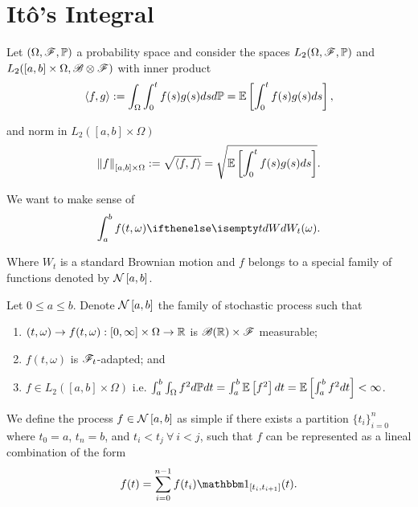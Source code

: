 \documentclass[../TGMAFFIRO.tex]{subfiles}
\begin{document}
\section{It\^o's Integral}
Let $(\Omega, \mathscr{F}, \mathbb{P})$ a probability space and consider the spaces $L_2(\Omega, \mathscr{F}, \mathbb{P})$ and $L_2([a, b]\times\Omega, \mathscr{B}\otimes\mathscr{F})$ with inner product
\begin{equation}
  \langle f, g\rangle := \int_\Omega\int_0^t f(s) g(s) ds d\mathbb{P} = \mathbb{E}\left[\int_0^t f(s)g(s) ds\right],
\end{equation}


and norm in $L_2([a, b] \times \Omega)$
\begin{equation}
  \left\lVert f\right\rVert_{[a, b] \times \Omega} := \sqrt{\langle f, f\rangle} = \sqrt{\mathbb{E}\left[\int_0^t f(s)g(s) ds\right]}.
\end{equation}

We want to make sense of
\begin{equation}
  \int_a^bf(t,\omega) \dW[t](\omega).
\end{equation}

Where $W_t$ is a standard Brownian motion and $f$ belongs to a special family of functions denoted by $\mathcal{N}\left[a, b\right]$.

\begin{definition}
	Let $0\leq a\leq b$. Denote $\mathcal{N}\left[a, b\right]$ the family of stochastic process such that
	\begin{enumerate}
		\item $(t, \omega) \to f(t, \omega):[0, \infty]\times\Omega \to \mathbb{R}$ is $\mathscr{B}(\mathbb{R})\times\mathscr{F}$ measurable;
		\item $f(t,\omega)$ is $\mathscr{F}_t$-adapted; and
		\item $f\in L_2([a,b]\times\Omega)$ i.e. $\int_a^b\int_\Omega f^2 d\mathbb{P} dt = \int_a^b\mathbb{E}\left[f^2\right]dt = \mathbb{E}\left[\int_a^b f^2 dt\right] < \infty$.
	\end{enumerate}
\end{definition}

\begin{definition}
	We define the process $f\in \mathcal{N}\left[a, b\right]$ as simple if there exists a partition $\{t_i\}_{i=0}^n$ where $t_0 = a$, $t_n = b$, and $t_i < t_j \ \forall \ i < j$, such that $f$ can be represented as a lineal combination of the form
	\begin{equation}
		f(t) = \sum_{i=0}^{n-1}f(t_i)\ind_{[t_i, t_{i+1}]}(t).
	\end{equation}
\end{definition}
\end{document}
